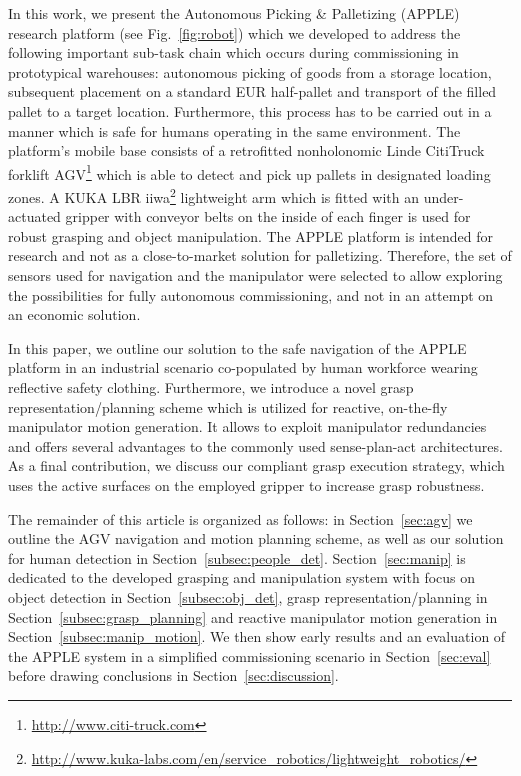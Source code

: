 In this work, we present the Autonomous Picking \& Palletizing (APPLE) research platform (see
Fig.~\ref{fig:robot}) which we developed to address the following important sub-task chain which
occurs during commissioning in prototypical warehouses: autonomous picking of goods from a storage
location, subsequent placement on a standard EUR half-pallet and transport of the filled pallet to a
target location. Furthermore, this process has to be carried out in a manner which is safe for
humans operating in the same environment. The platform's mobile base consists of a retrofitted
nonholonomic Linde CitiTruck forklift AGV\footnote{\url{ http://www.citi-truck.com}} which is able
to detect and pick up pallets in designated loading zones. A KUKA LBR
iiwa\footnote{\url{http://www.kuka-labs.com/en/service_robotics/lightweight_robotics/}} lightweight
arm which is fitted with an under-actuated gripper with conveyor belts on the inside of each finger
is used for robust grasping and object manipulation. The APPLE platform is intended for research and
not as a close-to-market solution for palletizing. Therefore, the set of sensors used for navigation
and the manipulator were selected to allow exploring the possibilities for fully autonomous
commissioning, and not in an attempt on an economic solution.

In this paper, we outline our solution to the safe navigation of the APPLE platform in an industrial
scenario co-populated by human workforce wearing reflective safety clothing. Furthermore, we
introduce a novel grasp representation/planning scheme which is utilized for reactive, on-the-fly
manipulator motion generation. It allows to exploit manipulator redundancies and offers several
advantages to the commonly used sense-plan-act architectures. As a final contribution, we discuss
our compliant grasp execution strategy, which uses the active surfaces on the employed gripper to
increase grasp robustness.

The remainder of this article is organized as follows: in Section~\ref{sec:agv} we outline the AGV
navigation and motion planning scheme, as well as our solution for human detection in
Section~\ref{subsec:people_det}. Section~\ref{sec:manip} is dedicated to the developed grasping and
manipulation system with focus on object detection in Section~\ref{subsec:obj_det}, grasp
representation/planning in Section~\ref{subsec:grasp_planning} and reactive manipulator motion
generation in Section~\ref{subsec:manip_motion}. We then show early results and an evaluation of the
APPLE system in a simplified commissioning scenario in Section~\ref{sec:eval} before drawing
conclusions in Section~\ref{sec:discussion}.
